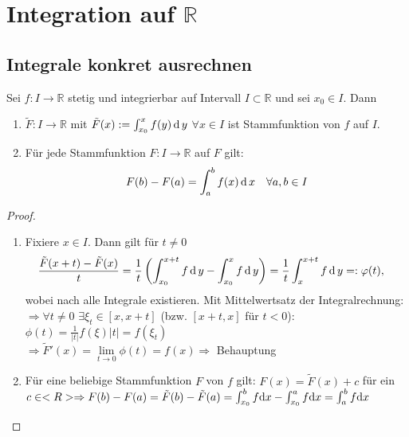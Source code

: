 \section{Integration auf \texorpdfstring{$\mathbb{R}$}{R}} \setcounter{equation}{0}

\subsection{Integrale konkret ausrechnen}
\begin{theorem}
	Sei $f:I\to\mathbb{R}$ stetig und integrierbar auf Intervall $I\subset\mathbb{R}$ und sei $x_0\in I$. Dann
	\begin{enumerate}[label={\alph*)}]
		\item $\tilde{F}:I\to \mathbb{R}$ mit $\tilde{F}(x) := \int_{x_0}^x f(y) \operatorname{d} y$ $\forall x\in I$ ist Stammfunktion von $f$ auf $I$.
		\item Für jede Stammfunktion $F:I\to \mathbb{R}$ auf $F$ gilt: \begin{align}
			F(b) - F(a) = \int_a^b f(x) \operatorname{d} x \quad\forall a,b\in I\notag
		\end{align}
	\end{enumerate}
\end{theorem}
\begin{proof}\hspace*{0pt}
	\NoEndMark
	\begin{enumerate}[label={\alph*},topsep=\dimexpr-\baselineskip/2\relax]
		\item Fixiere $x\in I$. Dann gilt für $t\neq 0$ \begin{align*}
			\frac{\tilde{F}(x + t) - \tilde{F}(x)}{t} &= \frac{1}{t} \left( \int_{x_0}^{x + t} f \operatorname{d} y - \int_{x_0}^{x} f \operatorname{d} y \right) = \frac{1}{t} \int_x^{x + t} f \operatorname{d} y =: \varphi(t),
		\end{align*}
		wobei nach alle Integrale existieren. Mit Mittelwertsatz der Integralrechnung:\\
		$\Rightarrow\forall t\neq 0$ $\exists \xi_t\in [x, x+t]$ (bzw. $[x + t, x]$ für $t < 0$): $\phi(t) = \frac{1}{\vert t \vert} f(\xi) \vert t \vert = f(\xi_t)$ \\
		$\Rightarrow\tilde{F}'(x) = \lim\limits_{t\to 0} \phi(t) = f(x)\Rightarrow$ Behauptung
		
		\item Für eine beliebige Stammfunktion $F$ von $f$ gilt: $F(x) = \tilde{F}(x) + c$ für ein $c\in <R>\Rightarrow F(b)-F(a)=\tilde{F}(b)-\tilde{F}(a)=\int_{x_0}^b f\mathrm{d} x-\int_{x_0}^a f\mathrm{d} x=\int_a^b f\mathrm{d} x$
	\end{enumerate}
\end{proof}


